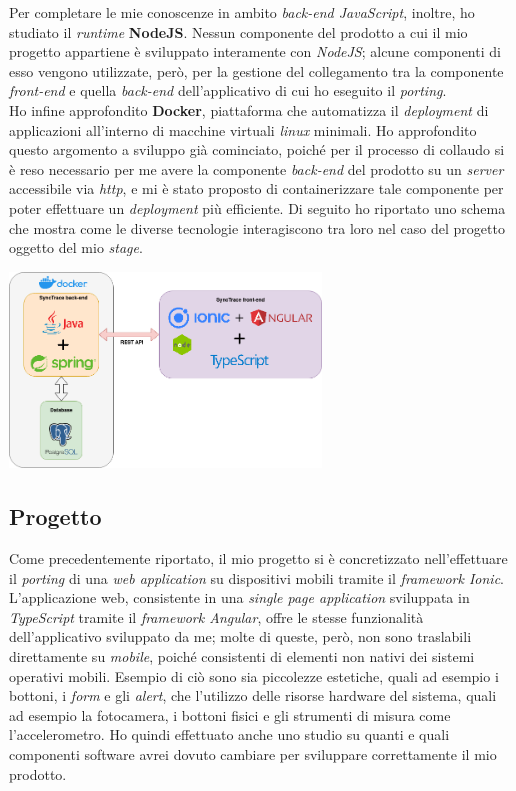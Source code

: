 Per completare le mie conoscenze in ambito \textit{back-end JavaScript}, inoltre, ho studiato il \textit{runtime} \textbf{NodeJS}. Nessun componente del prodotto a cui il mio progetto appartiene è sviluppato interamente con \textit{NodeJS}; alcune componenti di esso vengono utilizzate, però, per la gestione del collegamento tra la componente \textit{front-end} e quella \textit{back-end} dell'applicativo di cui ho eseguito il \textit{porting}. \\
Ho infine approfondito \textbf{Docker}, piattaforma che automatizza il \textit{deployment} di applicazioni all'interno di macchine virtuali \textit{linux} minimali. Ho approfondito questo argomento a sviluppo già cominciato, poiché per il processo di collaudo si è reso necessario per me avere la componente \textit{back-end} del prodotto su un \textit{server} accessibile via \textit{http}, e mi è stato proposto di containerizzare tale componente per poter effettuare un \textit{deployment} più efficiente. Di seguito ho riportato uno schema che mostra come le diverse tecnologie interagiscono tra loro nel caso del progetto oggetto del mio \textit{stage}. \\

\begin{minipage}{\linewidth}
  \centering
    \includegraphics[height=5.2cm]{immagini/tecnologie}
\end{minipage}

\subsection{Progetto}

Come precedentemente riportato, il mio progetto si è concretizzato nell'effettuare il \textit{porting} di una \textit{web application} su dispositivi mobili tramite il \textit{framework Ionic}. L'applicazione web, consistente in una \textit{single page application} sviluppata in \textit{TypeScript} tramite il \textit{framework Angular}, offre le stesse funzionalità dell'applicativo sviluppato da me; molte di queste, però, non sono traslabili direttamente su \textit{mobile}, poiché consistenti di elementi non nativi dei sistemi operativi mobili. Esempio di ciò sono sia piccolezze estetiche, quali ad esempio i bottoni, i \textit{form} e gli \textit{alert}, che l'utilizzo delle risorse hardware del sistema, quali ad esempio la fotocamera, i bottoni fisici e gli strumenti di misura come l'accelerometro. Ho quindi effettuato anche uno studio su quanti e quali componenti software avrei dovuto cambiare per sviluppare correttamente il mio prodotto.

